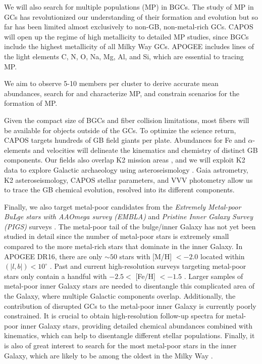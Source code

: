 \documentclass[onecolumn]{aa}
\begin{document}
We will also search for multiple populations (MP) in BGCs. The study of MP in GCs has revolutionized our understanding of their formation and evolution but so far has been limited almost exclusively to non-GB, non-metal-rich GCs. CAPOS will open up the regime of high metallicity to detailed MP studies, since BGCs include the highest metallicity of all Milky Way GCs. APOGEE includes lines of the light elements C, N, O, Na, Mg, Al, and Si, which are essential to tracing MP. 

We aim to observe  5-10 members per cluster to derive accurate mean abundances, search for and characterize MP, and constrain scenarios for the formation of MP.

Given the compact size of BGCs and fiber collision limitations, most fibers will be available for objects outside of the GCs. To optimize the science return, CAPOS targets
hundreds of GB field giants per plate. Abundances for Fe and $\alpha$-elements and velocities will delineate the kinematics and chemistry of distinct GB components. Our fields also overlap K2 mission areas \citep{Howell2014}, and we will exploit K2 data to explore Galactic archaeology using asteroseismology \citep{Johnson2016}. Gaia astrometry, K2 asteroseismology, CAPOS stellar parameters, and VVV photometry allow us to trace the GB chemical evolution, resolved into its different components.

Finally, we also target metal-poor candidates from the {\em Extremely Metal-poor BuLge stars with AAOmega survey (EMBLA)} \citep{Howes2016} and {\em Pristine Inner Galaxy Survey (PIGS)} surveys \citep{Starkenburg2017a, Arentsen2020}.
The metal-poor tail of the bulge/inner Galaxy has not yet been studied in detail since the number of metal-poor stars is extremely small compared to the more metal-rich stars that dominate in the inner Galaxy. In APOGEE DR16, there are only $\sim 50$ stars with [M/H] $< -2.0$ located within $(|l, b|) < 10^\circ$ \citep{DR16}. Past and current high-resolution surveys targeting metal-poor stars  only contain a handful  with $-2.5 <$ [Fe/H] $< -1.5$ \citep{Howes2016, Duong2019, Lucey2019}. Larger samples of metal-poor inner Galaxy stars are needed to disentangle this complicated area of the Galaxy, where multiple Galactic components overlap. Additionally, the contribution of disrupted GCs to the metal-poor inner Galaxy is currently poorly constrained. It is crucial to obtain high-resolution follow-up spectra for metal-poor inner Galaxy stars, providing detailed chemical abundances combined with kinematics, which can help to disentangle different stellar populations. Finally, it is also of great interest to search for the most metal-poor stars in the inner Galaxy, which are likely to be among the oldest in the Milky Way \citep[e.g.,][]{Tumlinson2010, Starkenburg2017b, Horta2021}.
\end{document}
